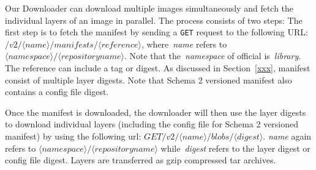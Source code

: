Our Downloader can download multiple images simultaneously and fetch
the individual layers of an image in parallel.
%
%
%
%
%
%
%
The process consists of two steps:
%
The first step is to fetch the manifest by sending a \texttt{GET} request to the
following URL: $/v2/\langle name \rangle/manifests/\langle reference \rangle$,
where~\textit{name} refers to
$\langle namespace\rangle/\langle repository name \rangle$.
%
Note that the~\textit{namespace} of official is~\textit{library}.
%
The reference can include a tag or digest.
%
%
As discussed in Section~\ref{xxx}, manifest consist of multiple layer digests.
%
Note that Schema 2 versioned manifest also contains a config file digest.


Once the manifest is downloaded, the downloader will then use the layer digests to
download individual layers (including the config file for Schema 2 versioned manifest)
by using the following url: $GET /v2/\langle name \rangle/blobs/\langle digest \rangle$.
\textit{name} again refers to $\langle namespace\rangle/\langle repository name \rangle$
while~\textit{digest} refers to the layer digest or config file digest.
Layers are transferred as gzip compressed tar archives.


